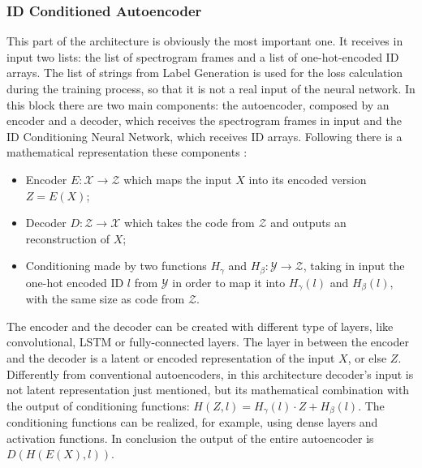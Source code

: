 \subsubsection{ID Conditioned Autoencoder}
This part of the architecture is obviously the most important one. It receives in input two lists: the list of spectrogram frames and a list of one-hot-encoded ID arrays. The list of strings from Label Generation is used for the loss calculation during the training process, so that it is not a real input of the neural network. In this block there are two main components: the autoencoder, composed by an encoder and a decoder, which receives the spectrogram frames in input and the ID Conditioning Neural Network, which receives ID arrays. Following there is a mathematical representation these components \cite{18IDConditionedAutoEncoder}:
\begin{itemize}
    \item {Encoder $E: \mathcal{X} \rightarrow \mathcal{Z}$ which maps the input $X$ into its encoded version $Z = E(X)$;}
    \item {Decoder $D:  \mathcal{Z} \rightarrow \mathcal{X}$ which takes the code from $\mathcal{Z}$ and outputs an reconstruction of $X$; }
    \item {Conditioning made by two functions $H_\gamma$ and $H_\beta: \mathcal{Y} \rightarrow \mathcal{Z}$, taking in input the one-hot encoded ID $l$ from $\mathcal{Y}$ in order to map it into $H_\gamma(l)$ and $H_\beta(l)$, with the same size as code from $\mathcal{Z}$.}
\end{itemize}
The encoder and the decoder can be created with different type of layers, like convolutional, LSTM or fully-connected layers. The layer in between the encoder and the decoder is a latent or encoded representation of the input $X$, or else $Z$. Differently from conventional autoencoders, in this architecture decoder's input is not latent representation just mentioned, but its mathematical combination with the output of conditioning functions: $H(Z,l) = H_\gamma(l) \cdot Z + H_\beta(l)$. The conditioning functions can be realized, for example, using dense layers and activation functions. In conclusion the output of the entire autoencoder is $D(H(E(X),l))$.


